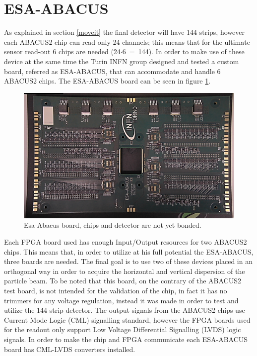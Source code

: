 \section{ESA-ABACUS}\label{esaabacus}
\noindent As explained in section \ref{moveit} the final detector will have 144 strips, however each ABACUS2 chip can read only 24 channels; this means that for the ultimate sensor read-out 6 chips are needed (24$\cdot$6~=~144).
In order to make use of these device at the same time the Turin INFN group designed and tested a custom board, referred as ESA-ABACUS, that can accommodate and handle 6 ABACUS2 chips.
The ESA-ABACUS board can be seen in figure \ref{fig:esaabacus}.
\begin{figure}[H]
	\centering
	\includegraphics[width=0.7\linewidth]{IMG/ch2/EsaAbacus.png}
	\caption{Esa-Abacus board, chips and detector are not yet bonded.}
	\label{fig:esaabacus}
\end{figure}
\noindent Each FPGA board used has enough Input/Output resources for two ABACUS2 chips. This means that, in order to utilize at his full potential the ESA-ABACUS, three boards are needed.
The final goal is to use two of these devices placed in an orthogonal way in order to acquire the horizontal and vertical dispersion of the particle beam.
To be noted that this board, on the contrary of the ABACUS2 test board, is not intended for the validation of the chip, in fact it has no trimmers for any voltage regulation, instead it was made in order to test and utilize the 144 strip detector.
The output signals from the ABACUS2 chips use Current Mode Logic (CML) signalling standard, however the FPGA boards used for the readout only support Low Voltage Differential Signalling (LVDS) logic signals.
In order to make the chip and FPGA communicate each ESA-ABACUS board has CML-LVDS converters installed.


